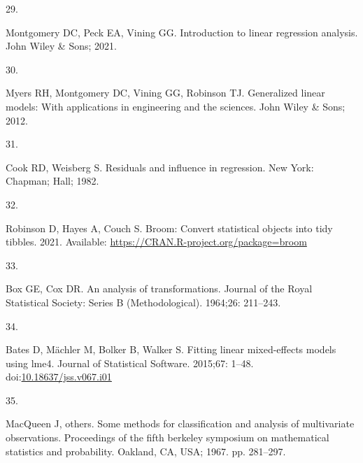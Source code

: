 \documentclass[10pt,letterpaper]{article}
\newlength{\cslhangindent}
\newlength{\csllabelwidth}
\newlength{\cslentryspacingunit} %
\newenvironment{CSLReferences}[2] %
 {%
  \setlength{\parindent}{0pt}
  \ifodd #1
  \let\oldpar\par
  \def\par{\hangindent=\cslhangindent\oldpar}
  \fi
  \setlength{\parskip}{#2\cslentryspacingunit}
 }%
 {}
\newcommand{\CSLLeftMargin}[1]{\parbox[t]{\csllabelwidth}{#1}}
\newcommand{\CSLRightInline}[1]{\parbox[t]{\linewidth - \csllabelwidth}{#1}\break}
\begin{document}
\begin{CSLReferences}{0}{0}
\leavevmode\hypertarget{ref-montgomery2021introduction}{}%
\CSLLeftMargin{29. }
\CSLRightInline{Montgomery DC, Peck EA, Vining GG. Introduction to
linear regression analysis. John Wiley \& Sons; 2021. }

\leavevmode\hypertarget{ref-myers2012generalized}{}%
\CSLLeftMargin{30. }
\CSLRightInline{Myers RH, Montgomery DC, Vining GG, Robinson TJ.
Generalized linear models: With applications in engineering and the
sciences. John Wiley \& Sons; 2012. }

\leavevmode\hypertarget{ref-cook1982residuals}{}%
\CSLLeftMargin{31. }
\CSLRightInline{Cook RD, Weisberg S. Residuals and influence in
regression. New York: Chapman; Hall; 1982. }

\leavevmode\hypertarget{ref-robinson2021broom}{}%
\CSLLeftMargin{32. }
\CSLRightInline{Robinson D, Hayes A, Couch S. Broom: Convert statistical
objects into tidy tibbles. 2021. Available:
\url{https://CRAN.R-project.org/package=broom}}

\leavevmode\hypertarget{ref-box1964analysis}{}%
\CSLLeftMargin{33. }
\CSLRightInline{Box GE, Cox DR. An analysis of transformations. Journal
of the Royal Statistical Society: Series B (Methodological). 1964;26:
211--243. }

\leavevmode\hypertarget{ref-bates2015lme4}{}%
\CSLLeftMargin{34. }
\CSLRightInline{Bates D, Mächler M, Bolker B, Walker S. Fitting linear
mixed-effects models using {lme4}. Journal of Statistical Software.
2015;67: 1--48.
doi:\href{https://doi.org/10.18637/jss.v067.i01}{10.18637/jss.v067.i01}}

\leavevmode\hypertarget{ref-macqueen1967some}{}%
\CSLLeftMargin{35. }
\CSLRightInline{MacQueen J, others. Some methods for classification and
analysis of multivariate observations. Proceedings of the fifth berkeley
symposium on mathematical statistics and probability. Oakland, CA, USA;
1967. pp. 281--297. }

\end{CSLReferences}

\nolinenumbers
\end{document}
